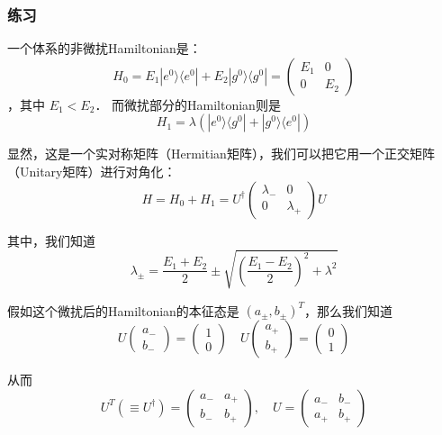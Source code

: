 \subsubsection{练习}
一个体系的非微扰Hamiltonian是：
\begin{equation}
H_0 = E_1|e^0\rangle\langle e^0| + E_2|g^0\rangle\langle g^0| =  \left(\begin{matrix} E_1 & 0\\ 0 & E_2\end{matrix}\right)
\end{equation}
，其中 $E_1<E_2$． 而微扰部分的Hamiltonian则是
\begin{equation}
H_1 = \lambda(|e^0\rangle\langle g^0|+|g^0\rangle\langle e^0|)
\end{equation}

显然，这是一个实对称矩阵（Hermitian矩阵），我们可以把它用一个正交矩阵（Unitary矩阵）进行对角化：
\begin{equation}
H = H_0+H_1 = U^\dagger\left(\begin{matrix} \lambda_- & 0\\0 & \lambda_+\end{matrix}\right)U
\end{equation}

其中，我们知道
\begin{equation}
\lambda_{\pm} = \frac{E_1+E_2}{2} \pm \sqrt{\left( \frac{E_1-E_2}{2}\right)^2 + \lambda^2}
\end{equation}

假如这个微扰后的Hamiltonian的本征态是 $(a_\pm,b_\pm)^T$，那么我们知道
\begin{equation}
U\left(\begin{matrix}a_-\\b_-\end{matrix}\right) = \left(\begin{matrix}1\\0\end{matrix}\right)\quad U\left(\begin{matrix}a_+\\b_+\end{matrix}\right) = \left(\begin{matrix}0\\1\end{matrix}\right)
\end{equation}

从而
\begin{equation}
U^T(\equiv U^\dagger) = \left(\begin{matrix}a_- & a_+\\b_- & b_+\end{matrix}\right), \quad U = \left(\begin{matrix}a_- & b_-\\a_+ & b_+\end{matrix}\right)
\end{equation}

